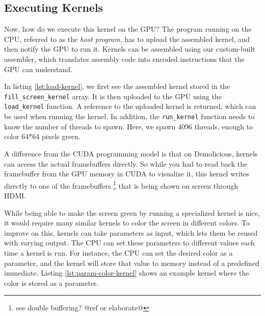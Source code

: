 \documentclass[../main/report.tex]{subfiles}
\begin{document}
\subsection{Executing Kernels}

Now, how do we execute this kernel on the GPU?
The program running on the CPU, referred to as the \emph{host program},
has to upload the assembled kernel, and then notify the GPU to run it.
Kernels can be assembled using our custom-built assembler,
which translates assembly code into encoded instructions that the GPU can understand.



In listing \ref{lst:load-kernel}, we first see the assembled kernel stored in the
\verb/fill_screen_kernel/ array.
It is then uploaded to the GPU using the \verb/load_kernel/ function.
A reference to the uploaded kernel is returned, which can be used when running the kernel.
In addition, the \verb/run_kernel/ function needs to know the number of threads to spawn.
Here, we spawn 4096 threads, enough to color 64*64 pixels green.

A difference from the CUDA programming model is that on Demolicious, kernels can access the actual framebuffers directly.
So while you had to read back the framebuffer from the GPU memory in CUDA to visualize it,
this kernel writes directly to one of the framebuffers \footnote{see double buffering? @ref or elaborate@} that is being shown on screen through HDMI.

While being able to make the screen green by running a specialized kernel is nice,
it would require many similar kernels to color the screen in different colors.
To improve on this, kernels can take parameters as input,
which lets them be reused with varying output.
The CPU can set these parameters to different values each time a kernel is run.
For instance, the CPU can set the desired color as a parameter,
and the kernel will store that value to memory instead of a predefined immediate.
Listing \ref{lst:param-color-kernel} shows an example kernel where the color is stored as a parameter.
\end{document}
